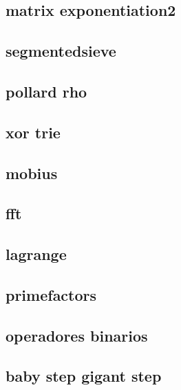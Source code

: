 \subsection{matrix exponentiation2}
\raggedbottom
\hrulefill
\subsection{segmentedsieve}
\raggedbottom
\hrulefill
\subsection{pollard rho}
\raggedbottom
\hrulefill
\subsection{xor trie}
\raggedbottom
\hrulefill
\subsection{mobius}
\raggedbottom
\hrulefill
\subsection{fft}
\raggedbottom
\hrulefill
\subsection{lagrange}
\raggedbottom
\hrulefill
\subsection{primefactors}
\raggedbottom
\hrulefill
\subsection{operadores binarios}
\raggedbottom
\hrulefill
\subsection{baby step gigant step}
\raggedbottom
\hrulefill
